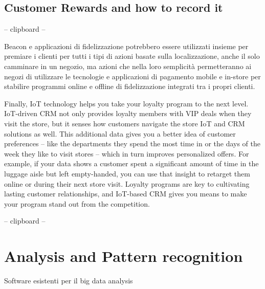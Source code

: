 \subsection{Customer Rewards and how to record it }


-- clipboard --

Beacon e applicazioni di fidelizzazione potrebbero essere utilizzati insieme per premiare i clienti per tutti i tipi di azioni basate sulla localizzazione, anche il solo camminare in un negozio, ma azioni che nella loro semplicità permetteranno ai negozi di utilizzare le tecnologie e applicazioni di pagamento mobile e in-store per stabilire programmi online e offline di fidelizzazione integrati tra i propri clienti.

Finally, IoT technology helps you take your loyalty program to the next level. IoT-driven CRM not only provides loyalty members with VIP deals when they visit the store, but it senses how customers navigate the store IoT and CRM solutions as well. This additional data gives you a better idea of customer preferences – like the departments they spend the most time in or the days of the week they like to visit stores – which in turn improves personalized offers. For example, if your data shows a customer spent a significant amount of time in the luggage aisle but left empty-handed, you can use that insight to retarget them online or during their next store visit. Loyalty programs are key to cultivating lasting customer relationships, and IoT-based CRM gives you means to make your program stand out from the competition.

-- clipboard --

\section{Analysis and Pattern recognition}

Software esistenti per il big data analysis



